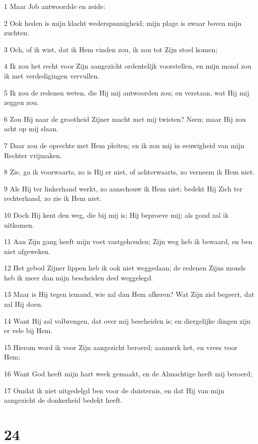 \par 1 Maar Job antwoordde en zeide:
\par 2 Ook heden is mijn klacht wederspannigheid; mijn plage is zwaar boven mijn zuchten.
\par 3 Och, of ik wist, dat ik Hem vinden zou, ik zou tot Zijn stoel komen;
\par 4 Ik zou het recht voor Zijn aangezicht ordentelijk voorstellen, en mijn mond zou ik met verdedigingen vervullen.
\par 5 Ik zou de redenen weten, die Hij mij antwoorden zou; en verstaan, wat Hij mij zeggen zou.
\par 6 Zou Hij naar de grootheid Zijner macht met mij twisten? Neen; maar Hij zou acht op mij slaan.
\par 7 Daar zou de oprechte met Hem pleiten; en ik zou mij in eeuwigheid van mijn Rechter vrijmaken.
\par 8 Zie, ga ik voorwaarts, zo is Hij er niet, of achterwaarts, zo verneem ik Hem niet.
\par 9 Als Hij ter linkerhand werkt, zo aanschouw ik Hem niet; bedekt Hij Zich ter rechterhand, zo zie ik Hem niet.
\par 10 Doch Hij kent den weg, die bij mij is; Hij beproeve mij; als goud zal ik uitkomen.
\par 11 Aan Zijn gang heeft mijn voet vastgehouden; Zijn weg heb ik bewaard, en ben niet afgeweken.
\par 12 Het gebod Zijner lippen heb ik ook niet weggedaan; de redenen Zijns monds heb ik meer dan mijn bescheiden deel weggelegd.
\par 13 Maar is Hij tegen iemand, wie zal dan Hem afkeren? Wat Zijn ziel begeert, dat zal Hij doen.
\par 14 Want Hij zal volbrengen, dat over mij bescheiden is; en diergelijke dingen zijn er vele bij Hem.
\par 15 Hierom word ik voor Zijn aangezicht beroerd; aanmerk het, en vrees voor Hem;
\par 16 Want God heeft mijn hart week gemaakt, en de Almachtige heeft mij beroerd;
\par 17 Omdat ik niet uitgedelgd ben voor de duisternis, en dat Hij van mijn aangezicht de donkerheid bedekt heeft.

\chapter{24}

